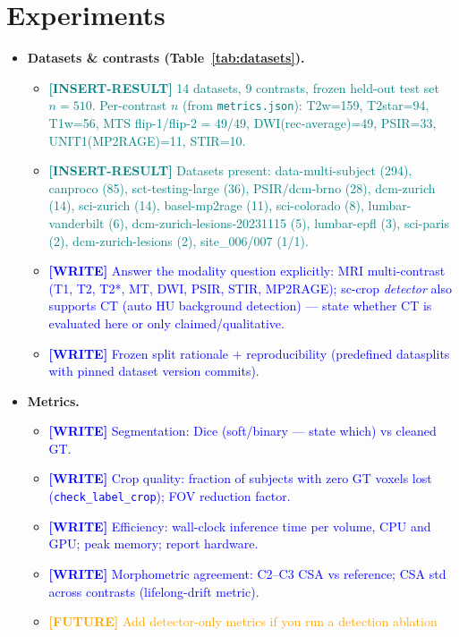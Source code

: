 \documentclass[11pt]{article}
\newcommand{\WRITE}[1]{\textcolor{blue}{\textbf{[WRITE]} #1}}
\newcommand{\RESULT}[1]{\textcolor{teal}{\textbf{[INSERT-RESULT]} #1}}
\newcommand{\FUTURE}[1]{\textcolor{orange}{\textbf{[FUTURE]} #1}}
\begin{document}
\section{Experiments}\label{sec:exp}
\begin{itemize}
  \item \textbf{Datasets \& contrasts (Table~\ref{tab:datasets}).}
    \begin{itemize}
      \item \RESULT{14 datasets, 9 contrasts, frozen held-out test set
            $n=510$. Per-contrast $n$ (from \texttt{metrics.json}):
            T2w=159, T2star=94, T1w=56, MTS flip-1/flip-2 = 49/49,
            DWI(rec-average)=49, PSIR=33, UNIT1(MP2RAGE)=11, STIR=10.}
      \item \RESULT{Datasets present: data-multi-subject (294), canproco (85),
            sct-testing-large (36), PSIR/dcm-brno (28), dcm-zurich (14),
            sci-zurich (14), basel-mp2rage (11), sci-colorado (8),
            lumbar-vanderbilt (6), dcm-zurich-lesions-20231115 (5),
            lumbar-epfl (3), sci-paris (2), dcm-zurich-lesions (2),
            site\_006/007 (1/1).}
      \item \WRITE{Answer the modality question explicitly: MRI multi-contrast
            (T1, T2, T2*, MT, DWI, PSIR, STIR, MP2RAGE); sc-crop \emph{detector}
            also supports CT (auto HU background detection) — state whether CT
            is evaluated here or only claimed/qualitative.}
      \item \WRITE{Frozen split rationale + reproducibility (predefined
            datasplits with pinned dataset version commits).}
    \end{itemize}
  \item \textbf{Metrics.}
    \begin{itemize}
      \item \WRITE{Segmentation: Dice (soft/binary — state which) vs cleaned GT.}
      \item \WRITE{Crop quality: fraction of subjects with zero GT voxels lost
            (\texttt{check\_label\_crop}); FOV reduction factor.}
      \item \WRITE{Efficiency: wall-clock inference time per volume, CPU and
            GPU; peak memory; report hardware.}
      \item \WRITE{Morphometric agreement: C2--C3 CSA vs reference; CSA std
            across contrasts (lifelong-drift metric).}
      \item \FUTURE{Add detector-only metrics if you run a detection ablation
}
\end{itemize}
\end{itemize}
\end{document}
